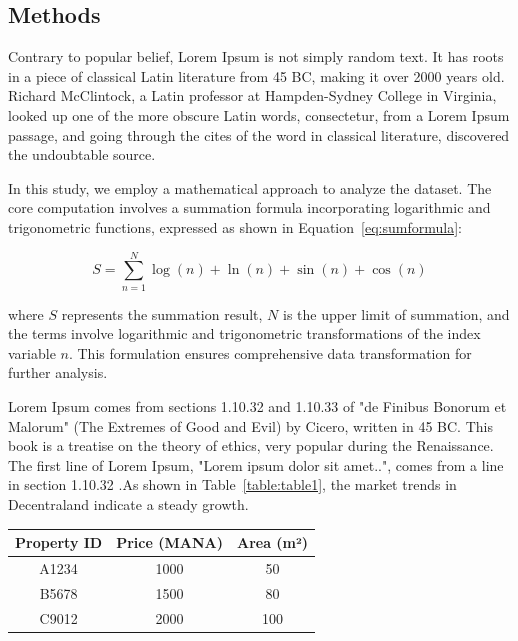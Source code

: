 \documentclass[a4paper]{article}
\begin{document}
\begin{multicols}{2}
\section{Methods}
Contrary to popular belief, Lorem Ipsum is not simply random text. It has roots in a piece of classical Latin literature from 45 BC, making it over 2000 years old. Richard McClintock, a Latin professor at Hampden-Sydney College in Virginia, looked up one of the more obscure Latin words, consectetur, from a Lorem Ipsum passage, and going through the cites of the word in classical literature, discovered the undoubtable source\cite{1,5,7}. 

In this study, we employ a mathematical approach to analyze the dataset. The core computation involves a summation formula incorporating logarithmic and trigonometric functions, expressed as shown in Equation~\eqref{eq:sumformula}:

\begin{equation}
S = \sum_{n=1}^{N} \log(n) + \ln(n) + \sin(n) + \cos(n) 
\label{eq:sumformula}
\end{equation}


where \( S \) represents the summation result, \( N \) is the upper limit of summation, and the terms involve logarithmic and trigonometric transformations of the index variable \( n \). This formulation ensures comprehensive data transformation for further analysis.

Lorem Ipsum comes from sections 1.10.32 and 1.10.33 of "de Finibus Bonorum et Malorum" (The Extremes of Good and Evil) by Cicero, written in 45 BC. This book is a treatise on the theory of ethics, very popular during the Renaissance. The first line of Lorem Ipsum, "Lorem ipsum dolor sit amet..", comes from a line in section 1.10.32 \cite{6,7}.As shown in Table~\ref{table:table1}, the market trends in Decentraland indicate a steady growth.

\noindent
\begin{minipage}{\columnwidth}
\label{table:table1}
\centering
\begin{tabular}{|c|c|c|}
    \hline
    \textbf{Property ID} & \textbf{Price (MANA)} & \textbf{Area (m²)} \\
    \hline
    A1234 & 1000 & 50 \\
    B5678 & 1500 & 80 \\
    C9012 & 2000 & 100 \\
    \hline
\end{tabular}
\end{minipage}


\end{multicols}
\end{document}
